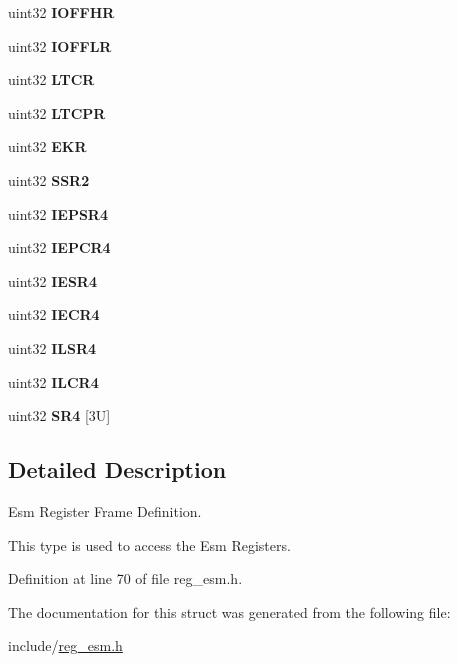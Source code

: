 \begin{DoxyCompactItemize}
uint32 {\bfseries I\+O\+F\+F\+HR}
\item 
\mbox{\label{structesmBase_a9da30c19d695a04472fb6f50f52974f8}} 
uint32 {\bfseries I\+O\+F\+F\+LR}
\item 
\mbox{\label{structesmBase_a1f6050dbdff0d9e294240d4bd0a042d2}} 
uint32 {\bfseries L\+T\+CR}
\item 
\mbox{\label{structesmBase_a336b5d520221ddedfe9dbf7bf83b6bad}} 
uint32 {\bfseries L\+T\+C\+PR}
\item 
\mbox{\label{structesmBase_acf71bf987383834aeebe1f323481bb8d}} 
uint32 {\bfseries E\+KR}
\item 
\mbox{\label{structesmBase_a223379ff2344faae3373e9076e311731}} 
uint32 {\bfseries S\+S\+R2}
\item 
\mbox{\label{structesmBase_a3f232e49a349c169c7531cc866efc051}} 
uint32 {\bfseries I\+E\+P\+S\+R4}
\item 
\mbox{\label{structesmBase_a381b45170e7f5460c11951a2e0b9e00a}} 
uint32 {\bfseries I\+E\+P\+C\+R4}
\item 
\mbox{\label{structesmBase_abaf1de68f276fb496d8fffed71ad87f6}} 
uint32 {\bfseries I\+E\+S\+R4}
\item 
\mbox{\label{structesmBase_a96988f2d7f164acc379eb8dfbbac4704}} 
uint32 {\bfseries I\+E\+C\+R4}
\item 
\mbox{\label{structesmBase_a9e98b7fd336140bdd150274f6a4b0e5b}} 
uint32 {\bfseries I\+L\+S\+R4}
\item 
\mbox{\label{structesmBase_aeff2eb30f562f0114ee9e81b8c410511}} 
uint32 {\bfseries I\+L\+C\+R4}
\item 
\mbox{\label{structesmBase_ad043005b53b18163271af246ba91996c}} 
uint32 {\bfseries S\+R4} \mbox{[}3\+U\mbox{]}
\end{DoxyCompactItemize}


\subsection{Detailed Description}
Esm Register Frame Definition. 

This type is used to access the Esm Registers. 

Definition at line 70 of file reg\+\_\+esm.\+h.



The documentation for this struct was generated from the following file\+:\begin{DoxyCompactItemize}
\item 
include/\mbox{\hyperlink{reg__esm_8h}{reg\+\_\+esm.\+h}}\end{DoxyCompactItemize}
